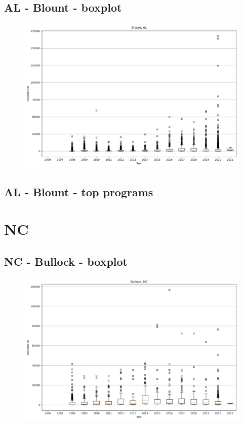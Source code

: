 \subsection*{AL - Blount - boxplot}
\begin{figure}[h]
\centering
\includegraphics[width=7in]{../output/boxplots/counties/Blount-AL_boxplot.png}
\end{figure}


\subsection*{AL - Blount - top programs}

\newpage
\section*{NC}
\subsection*{NC - Bullock - boxplot}
\begin{figure}[h]
\centering
\includegraphics[width=7in]{../output/boxplots/counties/Bullock-NC_boxplot.png}
\end{figure}


